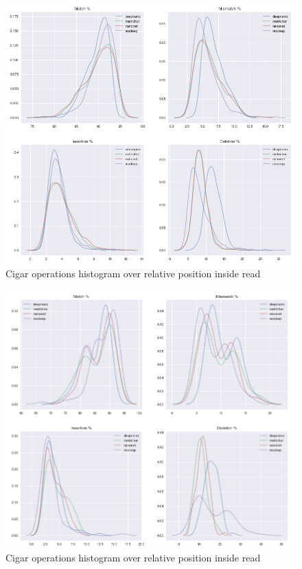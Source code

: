 \documentclass[times, utf8, diplomski, numeric, english]{fer}
\begin{document}
\begin{figure}[!ht]
	\begin{center}
		\includegraphics[width=1\textwidth]{./imgs/results/ecoli/kde_cigar.png}
		\caption{Cigar operations histogram over relative position inside read}
		\label{fg:ecoli_kde}
	\end{center}
\end{figure}

\begin{figure}[!ht]
	\begin{center}
		\includegraphics[width=1\textwidth]{./imgs/results/lambda/kde_cigar.png}
		\caption{Cigar operations histogram over relative position inside read}
		\label{fg:lambda_kde}
	\end{center}
\end{figure}
\end{document}
